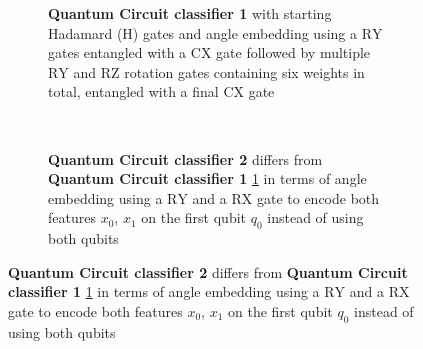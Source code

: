 \begin{figure}[!h]
    \centering
    
    \begin{subfigure}{1.0\textwidth}
        \centering
        \caption{\textbf{Quantum Circuit classifier 1} with starting Hadamard ($\mathrm{H}$) gates and angle embedding using a $\mathrm{RY}$ gates entangled with a $\mathrm{CX}$ gate followed by multiple $\mathrm{RY}$ and $\mathrm{RZ}$ rotation gates containing six weights in total, entangled with a final $\mathrm{CX}$ gate}
        \label{fig:two_qubit_circuit_1}
    \end{subfigure}
    \\[2ex]
    \begin{subfigure}{1.0\textwidth}
        \centering
        \caption{\textbf{Quantum Circuit classifier 2} differs from \textbf{Quantum Circuit classifier 1} \ref{fig:two_qubit_circuit_1} in terms of angle embedding using a $\mathrm{RY}$ and a $\mathrm{RX}$ gate to encode both features $x_0$, $x_1$ on the first qubit $q_0$ instead of using both qubits}

\end{subfigure}
\end{figure}
